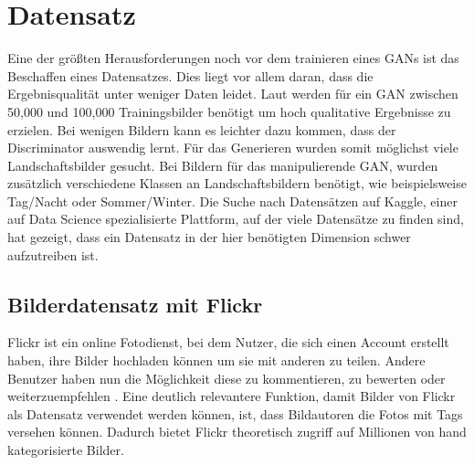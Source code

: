 \chapter{Datensatz}\label{chp:datensatz} %
\glsresetall
Eine der größten Herausforderungen noch vor dem trainieren eines GANs ist das Beschaffen eines Datensatzes.  Dies liegt vor allem daran, dass die Ergebnisqualität unter weniger Daten leidet. Laut   \cite{noauthor_nvidia_2020} werden für ein GAN zwischen 50,000 und 100,000 Trainingsbilder benötigt um hoch qualitative Ergebnisse zu erzielen. Bei wenigen Bildern kann es leichter dazu kommen, dass der Discriminator auswendig lernt. Für das Generieren wurden somit möglichst viele Landschaftsbilder gesucht. Bei Bildern für das manipulierende GAN, wurden zusätzlich verschiedene Klassen an Landschaftsbildern  benötigt, wie beispielsweise Tag/Nacht oder Sommer/Winter. Die Suche nach Datensätzen auf Kaggle, einer auf Data Science spezialisierte Plattform, auf der viele Datensätze zu finden sind, hat gezeigt, dass ein Datensatz in der hier benötigten Dimension schwer aufzutreiben ist.

\section{Bilderdatensatz mit Flickr} %
Flickr ist ein online Fotodienst, bei dem Nutzer, die sich einen Account erstellt haben, ihre Bilder hochladen können um sie mit anderen zu teilen. Andere Benutzer haben nun die Möglichkeit diese zu kommentieren, zu bewerten oder weiterzuempfehlen \cite{noauthor_was_nodate}. Eine deutlich relevantere Funktion, damit Bilder von Flickr als Datensatz verwendet werden können, ist, dass Bildautoren die Fotos mit Tags versehen können. Dadurch bietet Flickr theoretisch zugriff auf Millionen von hand kategorisierte Bilder. 

